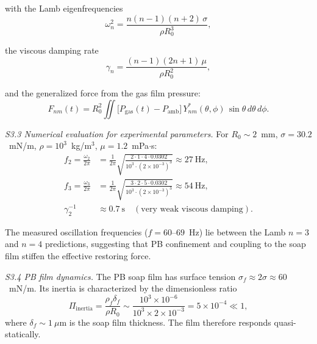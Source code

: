 \documentclass[%
 preprint,
 superscriptaddress,
 amsmath,amssymb,
 aps, prl,
]{revtex4-2}
\begin{document}
with the Lamb eigenfrequencies
\begin{equation}
\omega_n^2 = \frac{n(n-1)(n+2)\,\sigma}{\rho R_0^3},
\label{eq:s3_lamb_freq}
\end{equation}

the viscous damping rate
\begin{equation}
\gamma_n = \frac{(n-1)(2n+1)\,\mu}{\rho R_0^2},
\label{eq:s3_damping}
\end{equation}

and the generalized force from the gas film pressure:
\begin{equation}
F_{nm}(t) = R_0^2 \iint \bigl[P_{\text{gas}}(t) - P_{\text{amb}}\bigr]\,
Y_{nm}^*(\theta,\phi)\,\sin\theta\,d\theta\,d\phi.
\label{eq:s3_force}
\end{equation}

{\noindent\textit{S3.3 Numerical evaluation for experimental parameters.}}
For $R_0 \sim 2$~mm, $\sigma = 30.2$~mN/m, $\rho = 10^3$~kg/m$^3$, $\mu = 1.2$~mPa$\cdot$s:
\begin{align}
f_2 = \frac{\omega_2}{2\pi} &= \frac{1}{2\pi}\sqrt{\frac{2\cdot1\cdot4\cdot0.0302}{10^3\cdot(2\times10^{-3})^3}}
\approx 27~\text{Hz}, \\
f_3 = \frac{\omega_3}{2\pi} &= \frac{1}{2\pi}\sqrt{\frac{3\cdot2\cdot5\cdot0.0302}{10^3\cdot(2\times10^{-3})^3}}
\approx 54~\text{Hz}, \\
\gamma_2^{-1} &\approx 0.7~\text{s} \quad (\text{very weak viscous damping}).
\end{align}

The measured oscillation frequencies ($f = 60$--$69$~Hz) lie between the Lamb $n=3$ and $n=4$ predictions, suggesting that PB confinement and coupling to the soap film stiffen the effective restoring force.\par

{\noindent\textit{S3.4 PB film dynamics.}}
The PB soap film has surface tension $\sigma_f \approx 2\sigma \approx 60$~mN/m. Its inertia is characterized by the dimensionless ratio
\begin{equation}
\Pi_{\text{inertia}} = \frac{\rho_f\delta_f}{\rho R_0}
\sim \frac{10^3 \times 10^{-6}}{10^3 \times 2\times10^{-3}}
= 5\times10^{-4} \ll 1,
\label{eq:s3_inertia_ratio}
\end{equation}
where $\delta_f \sim 1~\mu\text{m}$ is the soap film thickness. The film therefore responds quasi-statically.\par
\end{document}
